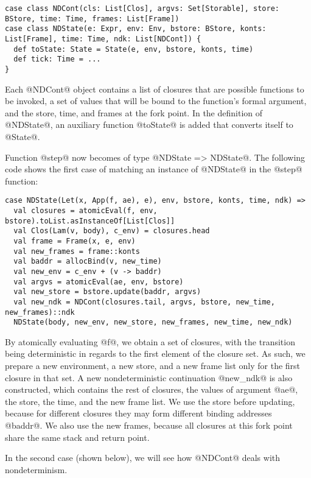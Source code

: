 \documentclass[acmsmall]{acmart}\settopmatter{}
\begin{document}
\begin{lstlisting}
case class NDCont(cls: List[Clos], argvs: Set[Storable], store: BStore, time: Time, frames: List[Frame])
case class NDState(e: Expr, env: Env, bstore: BStore, konts: List[Frame], time: Time, ndk: List[NDCont]) {
  def toState: State = State(e, env, bstore, konts, time)
  def tick: Time = ...
}
\end{lstlisting}

Each @NDCont@ object contains a list of closures that are possible functions to be invoked,
a set of values that will be bound to the function's formal argument,
and the store, time, and frames at the fork point.
In the definition of @NDState@, an auxiliary function @toState@ is added that
converts itself to @State@.

Function @step@ now becomes of type @NDState => NDState@.
The following code shows the first case of matching an instance of @NDState@ in
the @step@ function:

\begin{lstlisting}
case NDState(Let(x, App(f, ae), e), env, bstore, konts, time, ndk) =>
  val closures = atomicEval(f, env, bstore).toList.asInstanceOf[List[Clos]]
  val Clos(Lam(v, body), c_env) = closures.head
  val frame = Frame(x, e, env)
  val new_frames = frame::konts
  val baddr = allocBind(v, new_time)
  val new_env = c_env + (v -> baddr)
  val argvs = atomicEval(ae, env, bstore)
  val new_store = bstore.update(baddr, argvs)
  val new_ndk = NDCont(closures.tail, argvs, bstore, new_time, new_frames)::ndk
  NDState(body, new_env, new_store, new_frames, new_time, new_ndk)
\end{lstlisting}

By atomically evaluating @f@, we obtain a set of closures, with the transition being 
deterministic in regards to the first element of the closure set.
As such, we prepare a new environment, a new store, and a new frame list only for the
first closure in that set.
A new nondeterministic continuation @new_ndk@ is also constructed,
which contains the rest of closures, the values of argument @ae@, the store,
the time, and the new frame list.
We use the store before updating, because for different closures they may form
different binding addresses @baddr@.
We also use the new frames, because all closures at this fork point share
the same stack and return point.

In the second case (shown below), we will see how @NDCont@ deals with
nondeterminism.
\end{document}
